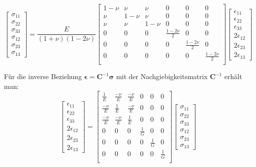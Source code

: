 \begin{equation}
\label{generalHook3}
\begin{bmatrix} 
\sigma_{11} \\
\sigma_{22} \\
\sigma_{33} \\
\sigma_{12} \\
\sigma_{23} \\
\sigma_{13} 
\end{bmatrix} = \frac{E}{(1+\nu)(1-2\nu)}\begin{bmatrix}
1-\nu & \nu & \nu & 0 & 0 & 0 \\
\nu & 1-\nu & \nu & 0 & 0 & 0 \\
\nu & \nu & 1-\nu & 0 & 0 & 0 \\
0 & 0 & 0 & \frac{1-2\nu}{2} & 0 & 0 \\
0 & 0 & 0 & 0 & \frac{1-2\nu}{2} & 0 \\
0 & 0 & 0 & 0 & 0 & \frac{1-2\nu}{2} \\ 
\end{bmatrix} \begin{bmatrix} \epsilon_{11} \\ \epsilon_{22} \\ \epsilon_{33} \\ 2\epsilon_{12} \\ 2\epsilon_{23} \\ 2\epsilon_{13} \end{bmatrix}
\end{equation}

Für die inverse Beziehung $\bm{\epsilon} = \bm{C}^{ -1} \bm{\sigma}$ mit der Nachgiebigkeitsmatrix $\bm{C}^{ -1}$ erhält man:
\begin{equation}
\label{generalHook4}
\begin{bmatrix} 
\epsilon_{11} \\
\epsilon_{22} \\
\epsilon_{33} \\
2\epsilon_{12} \\
2\epsilon_{23} \\
2\epsilon_{13} 
\end{bmatrix} =\begin{bmatrix}
\frac{1}{E} & \frac{-\nu}{E} & \frac{-\nu}{E} & 0 & 0 & 0 \\
\frac{-\nu}{E} & \frac{1}{E} & \frac{-\nu}{E} & 0 & 0 & 0 \\
\frac{-\nu}{E} & \frac{-\nu}{E} & \frac{1}{E} & 0 & 0 & 0 \\
0 & 0 & 0 & \frac{1}{G} & 0 & 0 \\
0 & 0 & 0 & 0 & \frac{1}{G} & 0 \\
0 & 0 & 0 & 0 & 0 & \frac{1}{G} \\ 
\end{bmatrix} \begin{bmatrix} \sigma_{11} \\ \sigma_{22} \\ \sigma_{33} \\ \sigma_{12} \\ \sigma_{23} \\ \sigma_{13} \end{bmatrix}
\end{equation}

